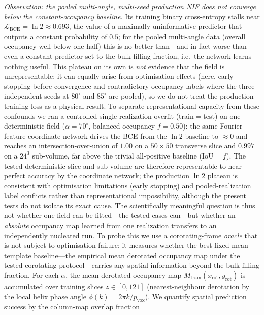 \documentclass[aip,amsmath,amssymb,reprint]{revtex4-1}
\newcommand{\dang}{\ensuremath{\alpha}}
\begin{document}
\textit{Observation: the pooled multi-angle, multi-seed production NIF does
not converge below the constant-occupancy baseline.}
Its training binary cross-entropy stalls near
$\mathcal{L}_{\mathrm{BCE}} = \ln 2 \approx 0.693$, the value of a
maximally uninformative predictor that outputs a constant probability
of $0.5$; for the pooled multi-angle data (overall occupancy well below
one half) this is no better than---and in fact worse than---even a
constant predictor set to the bulk filling fraction, i.e.\ the network
learns nothing useful.
This plateau on its own is \emph{not} evidence that the field is
unrepresentable: it can equally arise from optimisation effects
(here, early stopping before convergence and contradictory occupancy labels
where the three independent seeds at $80^{\circ}$ and $85^{\circ}$ are
pooled), so we do not treat the production training loss as a physical
result.
To separate representational capacity from these confounds we ran a
controlled single-realization overfit (train${}={}$test) on one
deterministic field ($\dang = 70^{\circ}$, balanced occupancy $f = 0.50$):
the same Fourier-feature coordinate network drives the BCE from the
$\ln 2$ baseline to $\approx 0$ and reaches an intersection-over-union of
$1.00$ on a $50\times50$ transverse slice and $0.997$ on a
$24^3$ sub-volume, far above the trivial all-positive baseline
($\mathrm{IoU} = f$).
The tested deterministic slice and sub-volume are therefore representable to
near-perfect accuracy by the coordinate network; the production $\ln 2$
plateau is consistent with optimisation limitations (early stopping) and
pooled-realization label conflicts rather than representational
impossibility, although the present tests do not isolate its exact cause.
The scientifically meaningful question is thus not whether one field can be
fitted---the tested cases can---but whether an \emph{absolute} occupancy map
learned from one realization transfers to an independently nucleated run.
To probe this we use a corotating-frame \emph{oracle} that is not subject to
optimisation failure: it measures whether the best fixed mean-template
baseline---the empirical mean derotated occupancy map under the tested
corotating protocol---carries any spatial information beyond the bulk
filling fraction.
For each $\dang$, the mean derotated occupancy map
$M_{\mathrm{train}}(x_{\mathrm{rot}}, y_{\mathrm{rot}})$ is
accumulated over training slices $z \in [0, 121]$ (nearest-neighbour derotation
by the local helix phase angle $\phi(k) = 2\pi k/p_{\mathrm{vox}}$).
We quantify spatial prediction success by the column-map overlap fraction
\end{document}
